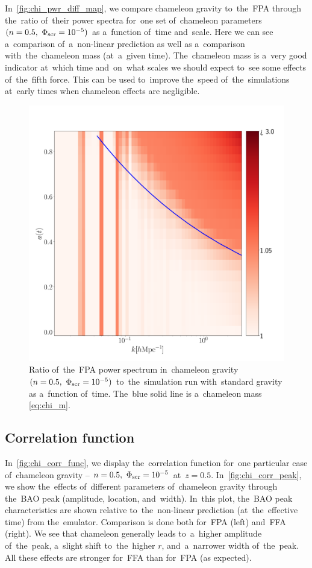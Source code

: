 In~\autoref{fig:chi_pwr_diff_map}, we compare chameleon gravity to~the~FPA through the~ratio of~their power spectra for~one set of~chameleon parameters $(n=0.5,\ \Phi_{\text{\scriptsize scr}}=10^{-5})$ as a~function of~time and~scale. Here we can see a~comparison of~a~non-linear prediction as well as a~comparison with~the~chameleon mass (at~a~given time). The~chameleon mass is a~very good indicator at~which time and~on~what scales we should expect to~see some effects of~the~fifth force. This can be used to~improve the~speed of~the~simulations at~early times when chameleon effects are negligible.
\begin{figure}[!tb]
	\centering
	\chileft
	\includegraphics[width=0.7\linewidth]{simulations_approx/chi/chi_pwr_diff_map_512m_1p_1024M_500b_nl.png}
	\caption{Ratio of~the~FPA power spectrum in~chameleon gravity $(n=0.5,\ \Phi_{\text{\scriptsize scr}}=10^{-5})$ to~the~simulation run with~standard gravity as a~function of~time. The~blue solid line is a~chameleon mass \eqref{eq:chi_m}.}
	\label{fig:chi_pwr_diff_map}
\end{figure}

\subsection{Correlation function}
In~\autoref{fig:chi_corr_func}, we display the~correlation function for~one particular case of~chameleon gravity -- $n=0.5,\ \Phi_{\text{\scriptsize scr}}=10^{-5}$ at~$z=0.5$. In~\autoref{fig:chi_corr_peak}, we show the~effects of~different parameters of~chameleon gravity through the~BAO peak (amplitude, location, and~width). In~this plot, the~BAO peak characteristics are shown relative to~the~non-linear prediction (at~the~effective time) from the~emulator. Comparison is done both for~FPA (left) and~FFA (right). We see that chameleon generally leads to~a~higher amplitude of~the~peak, a~slight shift to~the~higher $r$, and~a~narrower width of~the~peak. All these effects are stronger for~FFA than for~FPA (as expected).

